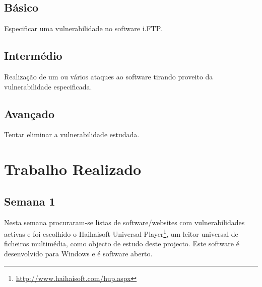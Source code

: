 \documentclass[a4paper]{article}
\begin{document}
\subsection*{Básico}
Especificar uma vulnerabilidade no software i.FTP.
\subsection*{Intermédio}
Realização de um ou vários ataques ao software tirando proveito da vulnerabilidade especificada.
\subsection*{Avançado}
Tentar eliminar a vulnerabilidade estudada.


\pagebreak
\section{Trabalho Realizado}
\subsection{Semana 1}


Nesta semana procuraram-se listas de software/websites com vulnerabilidades activas e foi escolhido o Haihaisoft Universal Player\footnote{\url{http://www.haihaisoft.com/hup.aspx}}, um leitor universal de ficheiros multimédia, como objecto de estudo deste projecto. Este software é desenvolvido para Windows e é software aberto.
\end{document}
